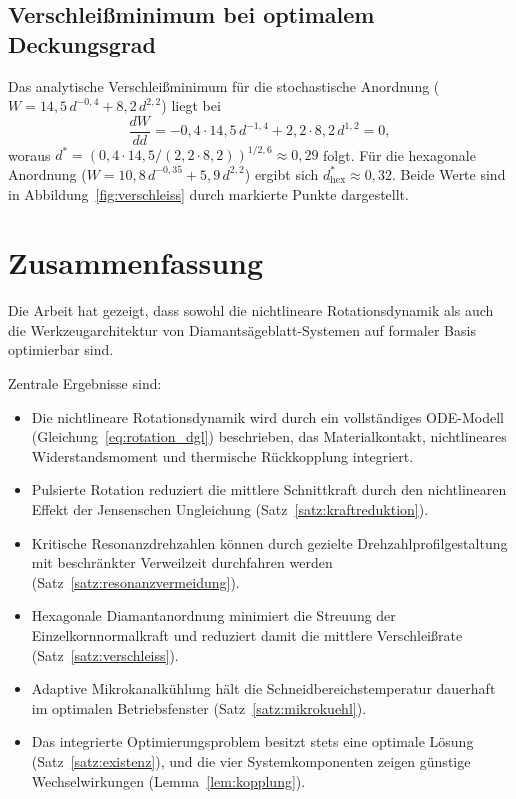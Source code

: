 ﻿\documentclass[a4paper,12pt]{article}
\theoremstyle{definition}
\begin{document}
\subsection{Verschleißminimum bei optimalem Deckungsgrad}

Das analytische Verschleißminimum für die stochastische Anordnung ($W = 14{,}5\,d^{-0{,}4} + 8{,}2\,d^{2{,}2}$)
liegt bei
\[
\frac{dW}{dd} = -0{,}4\cdot 14{,}5\,d^{-1{,}4} + 2{,}2\cdot 8{,}2\,d^{1{,}2} = 0,
\]
woraus $d^* = (0{,}4\cdot 14{,}5/(2{,}2\cdot 8{,}2))^{1/2{,}6} \approx 0{,}29$ folgt.
Für die hexagonale Anordnung ($W = 10{,}8\,d^{-0{,}35} + 5{,}9\,d^{2{,}2}$) ergibt sich
$d^*_{\mathrm{hex}} \approx 0{,}32$. Beide Werte sind in Abbildung~\ref{fig:verschleiss}
durch markierte Punkte dargestellt.

\section{Zusammenfassung}

Die Arbeit hat gezeigt, dass sowohl die nichtlineare Rotationsdynamik als auch
die Werkzeugarchitektur von Diamantsägeblatt-Systemen auf formaler Basis
optimierbar sind.

Zentrale Ergebnisse sind:
\begin{itemize}
\item Die nichtlineare Rotationsdynamik wird durch ein vollständiges ODE-Modell
      (Gleichung~\eqref{eq:rotation_dgl}) beschrieben, das Materialkontakt, nichtlineares
      Widerstandsmoment und thermische Rückkopplung integriert.
\item Pulsierte Rotation reduziert die mittlere Schnittkraft durch den nichtlinearen
      Effekt der Jensenschen Ungleichung (Satz~\ref{satz:kraftreduktion}).
\item Kritische Resonanzdrehzahlen können durch gezielte Drehzahlprofilgestaltung
      mit beschränkter Verweilzeit durchfahren werden (Satz~\ref{satz:resonanzvermeidung}).
\item Hexagonale Diamantanordnung minimiert die Streuung der Einzelkornnormalkraft
      und reduziert damit die mittlere Verschleißrate (Satz~\ref{satz:verschleiss}).
\item Adaptive Mikrokanalkühlung hält die Schneidbereichstemperatur dauerhaft im
      optimalen Betriebsfenster (Satz~\ref{satz:mikrokuehl}).
\item Das integrierte Optimierungsproblem besitzt stets eine optimale Lösung
      (Satz~\ref{satz:existenz}), und die vier Systemkomponenten zeigen günstige
      Wechselwirkungen (Lemma~\ref{lem:kopplung}).
\end{itemize}
\end{document}
